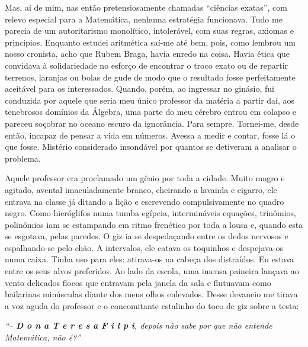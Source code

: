 Mas, ai de mim, nas então pretensiosamente chamadas ``ciências exatas'', com relevo especial para a Matemática, nenhuma estratégia funcionava. 
Tudo me parecia de um autoritarismo monolítico, intolerável, com suas regras, axiomas e princípios. 
Enquanto estudei aritmética saí-me até bem, pois, como lembrou um nosso cronista, acho que Rubem Braga, havia enredo na coisa. 
Havia ética que convidava à solidariedade no esforço de encontrar o troco exato ou de repartir terrenos, laranjas ou bolas de gude de modo que o resultado fosse perfeitamente aceitável para os interessados. 
Quando, porém, ao ingressar no ginásio, fui conduzida por aquele que seria meu único professor da matéria a partir daí, aos tenebrosos domínios da Álgebra, uma parte do meu cérebro entrou em colapso e pareceu soçobrar no oceano escuro da ignorância. 
Para sempre. 
Tornei-me, desde então, incapaz de pensar a vida em números. 
Avessa a medir e contar, fosse lá o que fosse. Mistério considerado insondável por quantos se detiveram a analisar o problema. 

Aquele professor era proclamado um gênio por toda a cidade. 
Muito magro e agitado, avental imaculadamente branco, cheirando a lavanda e cigarro, ele entrava na classe já ditando a lição e escrevendo compulsivamente no quadro negro. Como hieróglifos numa tumba egípcia, intermináveis equações, trinômios, polinômios iam se estampando em ritmo frenético por toda a lousa e, quando esta se esgotava, pelas paredes. 
O giz ia se despedaçando entre os dedos nervosos e espalhando-se pelo chão. 
A intervalos, ele catava os toquinhos e despejava-os numa caixa. 
Tinha uso para eles: atirava-os na cabeça dos distraídos. 
Eu estava entre os seus alvos preferidos. Ao lado da escola, uma imensa paineira lançava ao vento delicados flocos que entravam pela janela da sala e flutuavam como bailarinas minúsculas diante dos meus olhos enlevados.  
Desse devaneio me tirava a voz aguda do professor e o concomitante estalinho do toco de giz sobre a testa:

{\itshape``-- {\large\bfseries D o n a T e r e s a F i l p i}, depois não sabe por que não entende   Matemática, não é?''}

